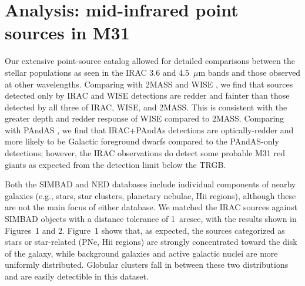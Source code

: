 \documentclass{iau}
\begin{document}
\section{Analysis: mid-infrared point sources in M31} 

Our extensive point-source catalog allowed for detailed comparisons between the stellar populations as seen in the IRAC
3.6 and 4.5~$\mu$m bands and those observed at other wavelengths. Comparing with 2MASS and WISE  \cite[(Rafiei Ravandi \etal\ 2016, Fig.\ 6)]{rr16}, 
we find that sources detected only by IRAC and WISE detections are redder and fainter than those detected by 
all three of IRAC, WISE, and 2MASS. This is consistent with the greater depth and redder response of WISE compared to 2MASS.
Comparing with PAndAS \cite[(Rafiei Ravandi \etal\ 2016, Fig.\ 7)]{rr16}, we find that IRAC+PAndAs detections are optically-redder and more likely to be
Galactic foreground  dwarfs compared to the PAndAS-only detections; however, the IRAC observations do detect some probable M31 red giants
as expected from the detection limit below the TRGB.

Both the SIMBAD and NED databases include individual components of nearby galaxies (e.g., stars, star clusters, planetary nebulae, H{\sc ii} regions),
although these are not the main focus of either database. We matched the IRAC sources against SIMBAD objects with a
distance tolerance of 1~arcsec, with the results shown in Figures~1 and 2.
Figure~1 shows that, as expected, the sources
categorized as stars or star-related (PNe, H{\sc ii} regions) are strongly concentrated toward the disk of the galaxy, while background
galaxies and active galactic nuclei are more uniformly distributed. Globular clusters fall in between these two distributions and
are easily detectible in this dataset.
\end{document}
